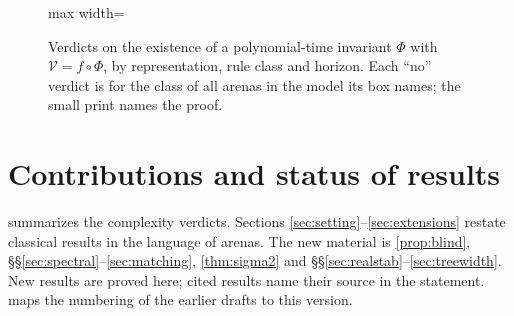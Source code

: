 \documentclass[final]{siamart0516}
\numberwithin{theorem}{section}
\numberwithin{equation}{section}
\theoremstyle{siamnonum}
\theoremstyle{plain}
\newcommand{\val}{\mathcal{V}}            %
\newcommand{\pay}{\mathcal{U}}            %
\newcommand{\cls}[1]{\mathsf{#1}}
\newcommand{\PSPACE}{\cls{PSPACE}}
\newcommand{\Pclass}{\cls{P}}
\begin{document}
\begin{figure}[t]
\begin{adjustbox}{max width=\linewidth}
\end{adjustbox}
\caption{Verdicts on the existence of a polynomial-time invariant $\Phi$ with $\val=f\circ\Phi$, by representation, rule class and horizon. Each ``no'' verdict is for the class of all arenas in the model its box names; the small print names the proof.}
\label{fig:glance}
\end{figure}

\section*{Contributions and status of results}

 summarizes the complexity verdicts. Sections \ref{sec:setting}--\ref{sec:extensions} restate classical results in the language of arenas. The new material is \cref{prop:blind}, \S\S\ref{sec:spectral}--\ref{sec:matching}, \cref{thm:sigma2} and \S\S\ref{sec:realstab}--\ref{sec:treewidth}. New results are proved here; cited results name their source in the statement.  maps the numbering of the earlier drafts to this version.
\end{document}
